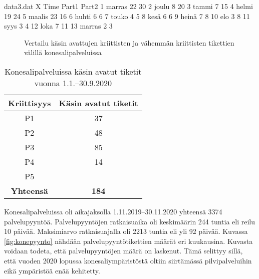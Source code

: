 \begin{filecontents}{data3.dat}
X Time  	Part1  Part2
1 marras  	22	    30
2 joulu		8	    20
3 tammi 	7	    15
4 helmi		19	    24
5 maalis	23	    16
6 huhti		6	    6
7 touko		4	    5
8 kesä      6       6
9 heinä     7       8
10 elo      3       8
11 syys     3       4
12 loka     7       11
13 marras   2       3
\end{filecontents}

\begin{figure}[ht]
\caption{Vertailu käsin avattujen kriittisten ja vähemmän kriittisten tikettien välillä konesalipalveluissa}
\label{fig:konesalitiketit}
\end{figure}

\begin{table}[ht]
\centering
\begin{tabular}{||c c||} 
 \hline
 Kriittisyys & Käsin avatut tiketit \\ [0.5ex] 
 \hline\hline
 P1 & 37 \\ 
 P2 & 48 \\
 P3 & 85 \\
 P4 & 14 \\
 P5 &  \\
 \textbf{Yhteensä} & \textbf{184} \\ [1ex] 
 \hline
\end{tabular}
\caption{Konesalipalveluissa käsin avatut tiketit vuonna 1.1.--30.9.2020}
\label{table:koneautomaatti}
\end{table}

Konesalipalveluissa oli aikajaksolla 1.11.2019--30.11.2020 yhteensä 3374 palvelupyyntöä. Palvelupyyntöjen ratkaisuaika oli keskimäärin 244 tuntia eli reilu 10 päivää. Maksimiarvo ratkaisuajalla oli 2213 tuntia eli yli 92 päivää. Kuvassa \ref{fig:konepyynto} nähdään palvelupyyntötikettien määrät eri kuukausina. Kuvasta voidaan todeta, että palvelupyyntöjen määrä on laskenut. Tämä selittyy sillä, että vuoden 2020 lopussa konesaliympäristöstä oltiin siirtämässä pilvipalveluihin eikä ympäristöä enää kehitetty.

